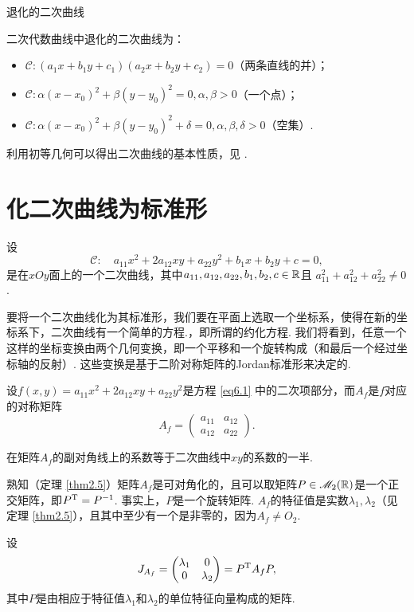{\noindent\kaishu 退化的二次曲线 }

二次代数曲线中退化的二次曲线为：
\begin{itemize}
  \item $\mathscr C:(a_1x+b_1y+c_1)(a_2x+b_2y+c_2)=0$（两条直线的并）；
  \item $\mathscr C:\alpha(x-x_0)^2+\beta(y-y_0)^2=0,\alpha,
      \beta>0$（一个点）；
  \item $\mathscr C:\alpha(x-x_0)^2+\beta(y-y_0)^2+\delta=0,
      \alpha,\beta,\delta>0$（空集）.
\end{itemize}

利用初等几何可以得出二次曲线的基本性质，见 \cite{2}.

\section{化二次曲线为标准形}
设
\begin{equation}\label{eq6.1}
  \mathscr C:\quad a_{11}x^2 + 2a_{12}xy + a_{22}y^2 + b_1x + b_2y + c = 0,
\end{equation}
是在$xOy$面上的一个二次曲线，其中$a_{11},a_{12},a_{22},b_1,b_2,c\in\mathbb R$且
$a_{11}^2+a_{12}^2+a_{22}^2\ne0$.

要将一个二次曲线化为其标准形，我们要在平面上选取一个坐标系，使得在新的坐标系下，二次曲线有一个简单的方程.，即所谓的约化方程. 我们将看到，任意一个这样的坐标变换由两个几何变换，即一个平移和一个旋转构成（和最后一个经过坐标轴的反射）. 这些变换是基于二阶对称矩阵的Jordan标准形来决定的.

设$f(x,y)=a_{11}x^2+2a_{12}xy+a_{22}y^2$是方程 \eqref{eq6.1} 中的二次项部分，而$A_f$是$f$对应的对称矩阵
\[
  A_f = \begin{pmatrix}
    a_{11} & a_{12} \\
    a_{12} & a_{22}
  \end{pmatrix}.
\]
\begin{nota}
  在矩阵$A_f$的副对角线上的系数等于二次曲线中$xy$的系数的一半.
\end{nota}

熟知（定理 \ref{thm2.5}）矩阵$A_f$是可对角化的，且可以取矩阵$P\in\mathscr M_2(\mathbb R)$是一个正交矩阵，即$P^{\mathrm T}=P^{-1}$. 事实上，$P$是一个旋转矩阵. $A_f$的特征值是实数$\lambda_1,\lambda_2$（见定理 \ref{thm2.5}），且其中至少有一个是非零的，因为$A_f\ne O_2$.

设
\[
  J_{A_f} = \begin{pmatrix}
    \lambda_1 & 0 \\
    0 & \lambda_2
  \end{pmatrix} = P^{\mathrm T} A_fP,
\]
其中$P$是由相应于特征值$\lambda_1$和$\lambda_2$的单位特征向量构成的矩阵.

